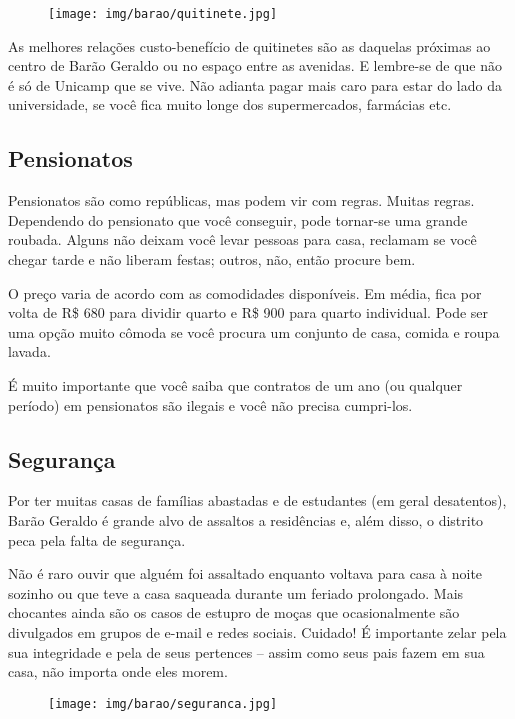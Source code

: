 \begin{figure}[h!]
    \centering
    \texttt{[image: img/barao/quitinete.jpg]}
\end{figure}

As melhores relações custo-benefício de quitinetes são as daquelas próximas ao
centro de Barão Geraldo ou no espaço entre as avenidas. E lembre-se de que não é
só de Unicamp que se vive. Não adianta pagar mais caro para estar do lado da
universidade, se você fica muito longe dos supermercados, farmácias etc.

\subsection{Pensionatos}

Pensionatos são como repúblicas, mas podem vir com regras. Muitas
regras. Dependendo do pensionato que você conseguir, pode tornar-se
uma grande roubada. Alguns não deixam você levar pessoas para casa,
reclamam se você chegar tarde e não liberam festas; outros, não, então
procure bem.

O preço varia de acordo com as comodidades disponíveis. Em média, fica
por volta de R\$ 680 para dividir quarto e R\$ 900 para quarto
individual. Pode ser uma opção muito cômoda se você procura um
conjunto de casa, comida e roupa lavada.

É muito importante que você saiba que contratos de um ano (ou qualquer período)
em pensionatos são ilegais e você não precisa cumpri-los.

\subsection{Segurança}

Por ter muitas casas de famílias abastadas e de estudantes (em geral
desatentos), Barão Geraldo é grande alvo de assaltos a residências e, além
disso, o distrito peca pela falta de segurança.

Não é raro ouvir que alguém foi assaltado enquanto voltava para casa à noite
sozinho ou que teve a casa saqueada durante um feriado prolongado. Mais
chocantes ainda são os casos de estupro de moças que ocasionalmente são
divulgados em grupos de e-mail e redes sociais. Cuidado! É importante zelar pela
sua integridade e pela de seus pertences -- assim como seus pais fazem em sua
casa, não importa onde eles morem.

\begin{figure}[h!]
    \centering
    \texttt{[image: img/barao/seguranca.jpg]}
\end{figure}

